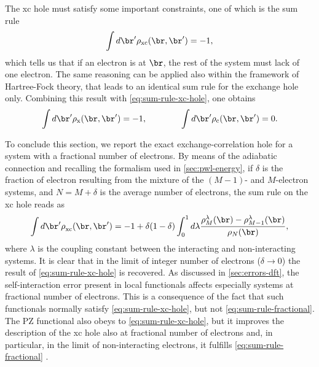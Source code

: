The xc hole must satisfy some important constraints, one of which is the sum rule
%
\begin{equation}
    \int d\br' \rho_{\rm xc}(\br,\br') = -1 ,
    \label{eq:sum-rule-xc-hole}
\end{equation}
%
which tells us that if an electron is at $\br$, the rest of the system must lack of one electron. The same reasoning can be applied also within the framework of Hartree-Fock theory, that leads to an identical sum rule for the exchange hole only. Combining this result with \cref{eq:sum-rule-xc-hole}, one obtains
%
\begin{equation}
    \int d\br' \rho_{\rm x}(\br,\br') = -1, \qquad \qquad \int d\br' \rho_{\rm c}(\br,\br') = 0 .
    \label{eq:sum-rule-x-hole-c-hole}
\end{equation}

To conclude this section, we report the exact exchange-correlation hole for a system with a fractional number of electrons. By means of the adiabatic connection and recalling the formalism used in \cref{sec:pwl-energy}, if $\delta$ is the fraction of electron resulting from the mixture of the $(M-1)$- and $M$-electron systems, and $N=M+\delta$ is the average number of electrons, the sum rule on the xc hole reads as \cite{perdew_what_1985}
%
\begin{equation}
    \int d\br' \rho_{\rm xc}^{\rm}(\br,\br') = -1 + \delta(1-\delta) \int_0^1 d\lambda \frac{\rho_{M}^{\lambda}(\br) - \rho_{M-1}^{\lambda}(\br)}{\rho_N(\br)} ,
    \label{eq:sum-rule-fractional}
\end{equation}
%
where $\lambda$ is the coupling constant between the interacting and non-interacting systems. It is clear that in the limit of integer number of electrons ($\delta \longrightarrow 0$) the result of \cref{eq:sum-rule-xc-hole} is recovered. As discussed in \cref{sec:errors-dft}, the self-interaction error present in local functionals affects especially systems at fractional number of electrons. This is a consequence of the fact that such functionals normally satisfy \cref{eq:sum-rule-xc-hole}, but not \cref{eq:sum-rule-fractional}. The PZ functional also obeys to \cref{eq:sum-rule-xc-hole}, but it improves the description of the xc hole also at fractional number of electrons and, in particular, in the limit of non-interacting electrons, it fulfills \cref{eq:sum-rule-fractional} \cite{perdew_what_1985}.
